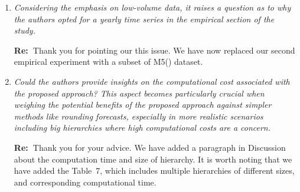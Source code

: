 \documentclass[11pt,a4paper]{article}
\newcommand{\RE}[2][Re:~]{{\color{blue}\textbf{#1}#2}}
\begin{document}
\begin{enumerate}
  \item \textit{Considering the emphasis on low-volume data, it raises a question as to why the authors opted for a yearly time series in the empirical section of the study.}
 
  \RE{Thank you for pointing our this issue. We have now replaced our second empirical experiment with a subset of M5(\citealp{makridakisM5AccuracyCompetition2022}) dataset.}
  
  \item \textit{Could the authors provide insights on the computational cost associated with the proposed approach? This aspect becomes particularly crucial when weighing the potential benefits of the proposed approach against simpler methods like rounding forecasts, especially in more realistic scenarios including big hierarchies where high computational costs are a concern.}
  
  \RE{Thank you for your advice. We have added a paragraph in Discussion about the computation time and size of hierarchy. It is worth noting that we have added the Table~7, which includes multiple hierarchies of different sizes, and corresponding computational time.}


\end{enumerate}

% 
% 
\printbibliography
\end{document}
